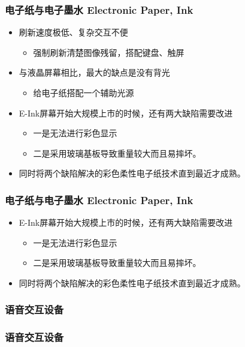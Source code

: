 \documentclass{beamer}
\newcommand{\fullPageImage}[2]{
	{
		\usebackgroundtemplate{\texttt{[image: \#1]}}
		\frame[plain]{#2}
	}
}
\begin{document}
\begin{frame}
	\frametitle{电子纸与电子墨水 Electronic Paper, Ink}
	\beamertemplatetransparentcovereddynamicmedium
	\begin{itemize}
		\item 刷新速度极低、复杂交互不便\pause
		\begin{itemize}
			\item 强制刷新清楚图像残留，搭配键盘、触屏
		\end{itemize}\pause
		\item 与液晶屏幕相比，最大的缺点是没有背光\pause
		\begin{itemize}
			\item 给电子纸搭配一个辅助光源
		\end{itemize}\pause
		\item E-Ink屏幕开始大规模上市的时候，还有两大缺陷需要改进\pause
		\begin{itemize}
			\item 一是无法进行彩色显示
			\item 二是采用玻璃基板导致重量较大而且易摔坏。
		\end{itemize}
		\item 同时将两个缺陷解决的彩色柔性电子纸技术直到最近才成熟。
	\end{itemize}
\end{frame}

\fullPageImage{images/glow-light.jpg}{\transwipe}
\fullPageImage{images/paper-white.jpg}{\transwipe}
\fullPageImage{images/paper-white-inside.jpg}{\transwipe}

\begin{frame}
	\frametitle{电子纸与电子墨水 Electronic Paper, Ink}
	\begin{itemize}
		\item E-Ink屏幕开始大规模上市的时候，还有两大缺陷需要改进
		\begin{itemize}
			\item 一是无法进行彩色显示
			\item 二是采用玻璃基板导致重量较大而且易摔坏。
		\end{itemize}
		\item 同时将两个缺陷解决的彩色柔性电子纸技术直到最近才成熟。
	\end{itemize}
\end{frame}

\fullPageImage{images/plastic-logic.jpg}{\transwipe}

\subsubsection{语音交互设备}
\begin{frame}
	\frametitle{语音交互设备}

\end{frame}
\end{document}
